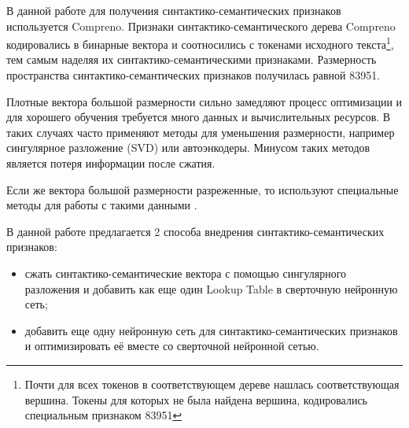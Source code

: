     В данной работе для получения синтактико-семантических признаков используется Compreno.
    Признаки синтактико-семантического дерева Compreno кодировались в бинарные вектора
    и соотносились с токенами исходного
    текста\footnote{Почти для всех токенов в соответствующем дереве нашлась соответствующая вершина.
    Токены для которых не была найдена вершина, кодировались специальным признаком 83951},
    тем самым наделяя их синтактико-се\-ман\-ти\-ческими признаками.
    Размерность пространства синтактико-се\-ман\-ти\-ческих признаков получилась равной 83951.

    Плотные вектора большой размерности сильно замедляют процесс оптимизации и для хорошего
    обучения требуется много данных и вычислительных ресурсов.
    В таких случаях часто применяют методы для уменьшения размерности,
    например сингулярное разложение (SVD) или автоэнкодеры. Минусом таких методов является потеря информации
    после сжатия.

    Если же вектора большой размерности разреженные, то используют специальные методы для
    работы с такими данными \citep{davissurvey}.

    В данной работе предлагается 2 способа внедрения синтактико-семантических признаков:
    \begin{itemize}
      \item сжать синтактико-семантические вектора с помощью сингулярного разложения и добавить
      как еще один Lookup Table в сверточную нейронную сеть;
      \item добавить еще одну нейронную сеть для синтактико-семантических признаков и оптимизировать
      её вместе со сверточной нейронной сетью.
    \end{itemize}
